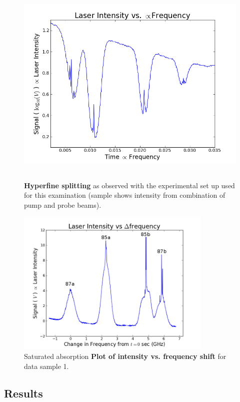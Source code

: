 \documentclass[paper=a4, fontsize=11pt]{scrartcl} %
\numberwithin{equation}{section}
\numberwithin{figure}{section}
\numberwithin{table}{section}
\begin{document}
\begin{figure}[h] \begin{center}
  \includegraphics[height=100mm]{3-1-001.png}
  \caption{\textbf{Hyperfine splitting} as observed with the experimental set up used for this examination (sample shows intensity from combination of pump and probe beams). }
  \label{fig:satabsorb1}
\end{center} \end{figure}

\begin{figure}[h] \begin{center}
  \includegraphics[height=70mm]{4-2-009.png}
  \caption{Saturated absorption \textbf{Plot of intensity vs. frequency shift} for data sample 1. }
  \label{fig:scaled_1}
\end{center} \end{figure}

\subsection{Results}
\end{document}
